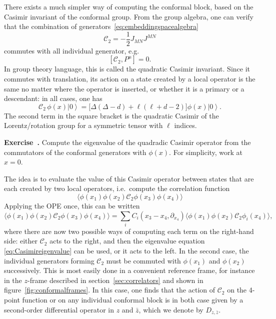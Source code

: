 \documentclass[a4paper,12pt]{article}
\newcommand{\ket}[1]{\left| #1 \right\rangle}
\numberwithin{equation}{section}
\newcounter{exercise}[section]
\newenvironment{exercise}[1][]%
	{\refstepcounter{exercise}\bigskip
	\begin{mdframed}[backgroundcolor=gray!20, linewidth=0]
	\noindent\textbf{Exercise~\thesection.\theexercise #1} \rmfamily}
  	{\end{mdframed}\bigskip}
\begin{document}
There exists a much simpler way of computing the conformal block, based on the Casimir invariant of the conformal group.
From the group algebra, one can verify that the combination of generators~\eqref{eq:embeddingspacealgebra}
\begin{equation}
	\mathcal{C}_2 = -\frac{1}{2} J_{MN} J^{MN}
\end{equation}
commutes with all individual generator, e.g.
\begin{equation}
	\left[ \mathcal{C}_2, P^\mu \right] = 0.
\end{equation}
In group theory language, this is called the quadratic Casimir invariant.
Since it commutes with translation, its action on a state created by a local operator is the same no matter where the operator is inserted, or whether it is a primary or a descendant: in all cases, one has
\begin{equation}
	\mathcal{C}_2 \, \phi(x) \ket{0}
	= \big[ \Delta (\Delta - d) + \ell (\ell + d - 2) \big]
	\phi(x) \ket{0}.
	\label{eq:Casimireigenvalue}
\end{equation}
The second term in the square bracket is the quadratic Casimir of the Lorentz/rotation group for a symmetric tensor with $\ell$ indices.
%
\begin{exercise}
	Compute the eigenvalue of the quadradic Casimir operator
	from the commutators of the conformal generators with $\phi(x)$.
	For simplicity, work at $x = 0$. 
\end{exercise}
%
The idea is to evaluate the value of this Casimir operator between states that are each created by two local operators, i.e.~compute the correlation function
\begin{equation}
	\langle \phi(x_1) \phi(x_2) \mathcal{C}_2 
	\phi(x_3) \phi(x_4) \rangle
\end{equation}
Applying the OPE once, this can be written
\begin{equation}
	\langle \phi(x_1) \phi(x_2) \mathcal{C}_2 \phi(x_3) \phi(x_4) \rangle
	= \sum_i C_i\left( x_3 - x_4, \partial_{x_4} \right)
	\langle \phi(x_1) \phi(x_2) \mathcal{C}_2 \phi_i(x_4) \rangle,
\end{equation}
where there are now two possible ways of computing each term on the right-hand side: either $\mathcal{C}_2$ acts to the right, and then the eigenvalue equation \eqref{eq:Casimireigenvalue} can be used, or it acts to the left. In the second case, the individual generators forming $\mathcal{C}_2$ must be commuted with $\phi(x_1)$ and $\phi(x_2)$ successively. This is most easily done in a convenient reference frame, for instance in the $z$-frame described in section~\ref{sec:correlators} and shown in figure~\ref{fig:conformalframes}. In this case, one finds that the action of $\mathcal{C}_2$ on the 4-point function or on any individual conformal block is in both case given by a second-order differential operator in $z$ and $\bar{z}$, which we denote by $D_{z, \bar{z}}$. 
\end{document}
